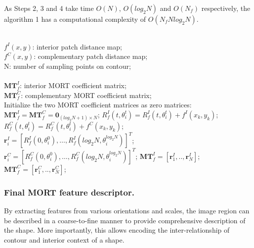 \documentclass[letterpaper]{article} %
\begin{document}
As Steps 2, 3 and 4 take time $O(N)$, $O(log_2 N)$ and $O(N_f)$ respectively, the algorithm 1 has a computational complexity of $O(N_f N log_2 N)$.
\renewcommand{\algorithmicrequire}{ \textbf{Input:}} 
\renewcommand{\algorithmicensure}{ \textbf{Output:}} 
\begin{algorithm}[t]
\caption{Calculating discrete Multi-Orientation Region Transform}
\begin{algorithmic}[1]
\REQUIRE ~~\\
$f^I (x,y)$: interior patch distance map;\\
$f^C (x,y)$: complementary patch distance map;\\
N: number of sampling points on contour;\\
\ENSURE ~~\\
$\boldsymbol{MT}_f^I$: interior MORT coefficient matrix;\\
$\boldsymbol{MT}_f^C$: complementary MORT coefficient matrix;\\
\STATE Initialize the two MORT coefficient  matrices as zero matrices: $\boldsymbol{MT}_f^I= \boldsymbol{MT}_f^C = \boldsymbol{0}_{(log_2 N+1)\times N}$;
\STATE  $R_f^I (t,\theta_i^t )=R_f^I (t,\theta_i^t )+ f^I (x_k,y_k )$; 
\STATE  $R_f^C (t,\theta_i^t )=R_f^C (t,\theta_i^t )+ f^C (x_k,y_k )$; 
\ENDFOR
\ENDFOR
\STATE   $\boldsymbol{r}_i^I=[R_f^I (0,\theta_i^0 ),\dots,R_f^I (log_2 N,\theta_i^{log_2 N}) ]^T$;   
\STATE  $\boldsymbol{r}_i^C=[R_f^C (0,\theta_i^0 ),\dots,R_f^C (log_2 N,\theta_i^{log_2 N}) ]^T$;  
\ENDFOR
\STATE $\boldsymbol{MT}_f^I=[\boldsymbol{r}_1^I,..,\boldsymbol{r}_N^I]$;        \STATE $\boldsymbol{MT}_f^C=[\boldsymbol{r}_1^C,..,\boldsymbol{r}_N^C]$;       
\label{code:recentEnd}
\end{algorithmic}
\end{algorithm}

\subsubsection{Final MORT feature descriptor.}

By extracting features from various orientations and scales, the image region can be described in a coarse-to-fine manner to provide comprehensive description of the shape. More importantly, this allows encoding the inter-relationship of contour and interior context of a shape. 
\end{document}

